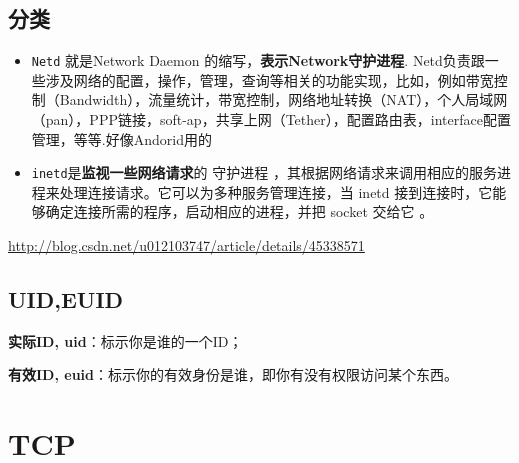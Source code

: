 \documentclass[UTF8,a4paper,8pt]{ctexbook}
\begin{document}
		\subsection{分类}
			\begin{itemize}
				\item \verb|Netd| 就是Network Daemon 的缩写，\textbf{表示Network守护进程}. Netd负责跟一些涉及网络的配置，操作，管理，查询等相关的功能实现，比如，例如带宽控制（Bandwidth），流量统计，带宽控制，网络地址转换（NAT），个人局域网（pan），PPP链接，soft-ap，共享上网（Tether），配置路由表，interface配置管理，等等.好像Andorid用的
				
				\item \verb|inetd|是\textbf{监视一些网络请求}的 守护进程 ，其根据网络请求来调用相应的服务进程来处理连接请求。它可以为多种服务管理连接，当 inetd 接到连接时，它能够确定连接所需的程序，启动相应的进程，并把 socket 交给它 。
			\end{itemize}	
		\url{http://blog.csdn.net/u012103747/article/details/45338571}
		
		\subsection{UID,EUID}
			\textbf{实际ID, uid}：标示你是谁的一个ID；
			 
			\textbf{有效ID, euid}：标示你的有效身份是谁，即你有没有权限访问某个东西。
	\section{TCP}
\end{document}
